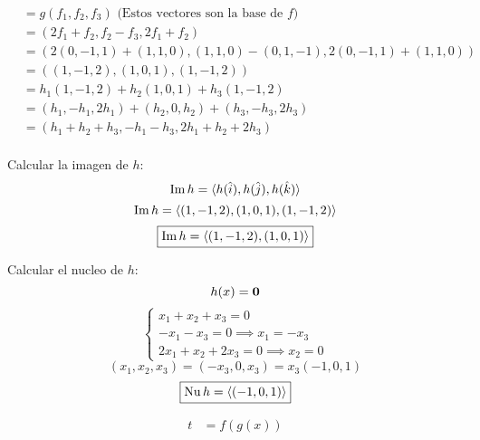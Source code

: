 \documentclass[../practica.root.tex]{subfiles}
\begin{document}
\begin{enumerate}
\begin{enumerate}
\begin{align*}
                          & = g( f_1,f_2,f_3 ) \text{ (Estos vectores son la base de $f$)}   \\
                          & = (2f_1 + f_2, f_2 - f_3,2f_1 + f_2)                             \\
                          & = (2(0,-1,1) + (1,1,0), (1,1,0) - (0,1,-1), 2(0,-1,1) + (1,1,0)) \\
                          & = ( (1,-1,2), (1,0,1), (1,-1,2) )                                \\
                          & = h_1(1,-1,2) + h_2(1,0,1) + h_3(1,-1,2)                         \\
                          & = (h_1,-h_1,2h_1) + (h_2,0,h_2) + (h_3,-h_3,2h_3)                \\
                          & = (h_1 + h_2 + h_3, -h_1 -h_3, 2h_1 + h_2 + 2h_3)                \\
                    \end{align*}
                    \begin{minipage}[t]{0.5\textwidth}
                        Calcular la imagen de \(h\):
                        \[ \operatorname{Im} h = \langle h(\hat{i}),h(\hat{j}),h(\hat{k}) \rangle \]
                        \[ \operatorname{Im} h = \langle (1,-1,2),(1,0,1),(1,-1,2) \rangle \]
                        \[ \boxed{\operatorname{Im} h = \langle (1,-1,2),(1,0,1) \rangle} \]
                    \end{minipage}
                    \begin{minipage}[t]{0.5\textwidth}
                        Calcular el nucleo de \(h\):
                        \[ h(x) = \mathbf{0} \]
                        \[
                            \begin{cases}
                                x_1 + x_2 + x_3 = 0               \\
                                -x_1 -x_3 = 0 \implies x_1 = -x_3 \\
                                2x_1 + x_2 + 2x_3 = 0 \implies x_2 = 0
                            \end{cases}
                        \] \[
                            (x_1, x_2, x_3) = (-x_3,0,x_3) = x_3(-1,0,1)
                        \] \[
                            \boxed{\operatorname{Nu} h = \langle (-1,0,1) \rangle}
                        \]
                    \end{minipage}
                    \begin{align*}
                        t & = f(g(x))                                                               \\

\end{align*}
\end{enumerate}
\end{enumerate}
\end{document}
